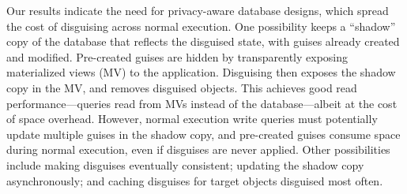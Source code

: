 %
Our results indicate the need for privacy-aware database designs, which spread the cost of
disguising across normal execution.
%
One possibility keeps a ``shadow'' copy of the database that reflects the disguised state, with
guises already created and modified.
%
Pre-created guises are hidden by transparently exposing materialized views (MV) to the
application.
%
Disguising then exposes the shadow copy in the MV, and removes disguised objects.
%
This achieves good read performance---queries read from MVs instead of the database---albeit
at the cost of space overhead.
%
However, normal execution write queries must potentially update multiple guises in the
shadow copy, and pre-created guises consume space during normal execution, even if disguises
are never applied.
%
Other possibilities include making disguises eventually consistent; updating the shadow copy
asynchronously; and caching disguises for target objects disguised most often.
